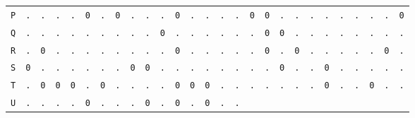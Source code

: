 \begin{figure}[H]
\begin{center}
{\begin{tabular}{c|cccccccccccccccccccccccccc}
        \texttt{P} & \texttt{.} & \texttt{.} & \texttt{.} &
        \texttt{.} & \texttt{0} & \texttt{.} & \texttt{0} &
        \texttt{.} & \texttt{.} & \texttt{.} & \texttt{0} &
        \texttt{.} & \texttt{.} & \texttt{.} & \texttt{.} &
        \texttt{0} & \texttt{0} & \texttt{.} & \texttt{.} &
        \texttt{.} & \texttt{.} & \texttt{.} & \texttt{.} &
        \texttt{.} & \texttt{.} & \texttt{0}                             \\
        \texttt{Q} & \texttt{.} & \texttt{.} & \texttt{.} &
        \texttt{.} & \texttt{.} & \texttt{.} & \texttt{.} &
        \texttt{.} & \texttt{.} & \texttt{0} & \texttt{.} &
        \texttt{.} & \texttt{.} & \texttt{.} & \texttt{.} &
        \texttt{.} & \texttt{0} & \texttt{0} & \texttt{.} &
        \texttt{.} & \texttt{.} & \texttt{.} & \texttt{.} &
        \texttt{.} & \texttt{.} & \texttt{.}                             \\
        \texttt{R} & \texttt{.} & \texttt{0} & \texttt{.} &
        \texttt{.} & \texttt{.} & \texttt{.} & \texttt{.} &
        \texttt{.} & \texttt{.} & \texttt{.} & \texttt{0} &
        \texttt{.} & \texttt{.} & \texttt{.} & \texttt{.} &
        \texttt{.} & \texttt{0} & \texttt{.} & \texttt{0} &
        \texttt{.} & \texttt{.} & \texttt{.} & \texttt{.} &
        \texttt{.} & \texttt{0} & \texttt{.}                             \\
        \texttt{S} & \texttt{0} & \texttt{.} & \texttt{.} &
        \texttt{.} & \texttt{.} & \texttt{.} & \texttt{.} &
        \texttt{0} & \texttt{0} & \texttt{.} & \texttt{.} &
        \texttt{.} & \texttt{.} & \texttt{.} & \texttt{.} &
        \texttt{.} & \texttt{.} & \texttt{0} & \texttt{.} &
        \texttt{.} & \texttt{0} & \texttt{.} & \texttt{.} &
        \texttt{.} & \texttt{.} & \texttt{.}                             \\
        \texttt{T} & \texttt{.} & \texttt{0} & \texttt{0} &
        \texttt{0} & \texttt{.} & \texttt{0} & \texttt{.} &
        \texttt{.} & \texttt{.} & \texttt{.} & \texttt{0} &
        \texttt{0} & \texttt{0} & \texttt{.} & \texttt{.} &
        \texttt{.} & \texttt{.} & \texttt{.} & \texttt{.} &
        \texttt{.} & \texttt{0} & \texttt{.} & \texttt{.} &
        \texttt{0} & \texttt{.} & \texttt{.}                             \\
        \texttt{U} & \texttt{.} & \texttt{.} & \texttt{.} &
        \texttt{.} & \texttt{0} & \texttt{.} & \texttt{.} &
        \texttt{.} & \texttt{0} & \texttt{.} & \texttt{0} &
        \texttt{.} & \texttt{0} & \texttt{.} & \texttt{.} &

\end{tabular}}
\end{center}
\end{figure}
